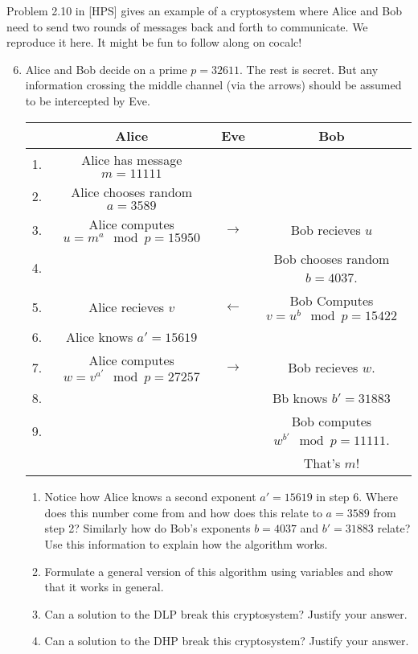 \documentclass[11pt]{article}
\begin{document}
Problem 2.10 in [HPS] gives an example of a cryptosystem where Alice and Bob need to send two rounds of messages back and forth to communicate.  We reproduce it here.  It might be fun to follow along on cocalc!
\begin{enumerate}
  \setcounter{enumi}{5}
  \item{
  Alice and Bob decide on a prime $p = 32611$.  The rest is secret.  But any information crossing the middle channel (via the arrows) should be assumed to be intercepted by Eve.\\
  \begin{tabular}{l|c||c||c}
    &Alice &Eve& Bob\\
    \hline\hline
    1.&Alice has message $m = 11111$&&\\
    \hline
    2.&Alice chooses random $a = 3589$&&\\
    \hline
    3.&Alice computes $u = m^a\mod p = 15950$ & $\longrightarrow$ &Bob recieves $u$\\
    \hline
    4.&&&Bob chooses random $b = 4037$.\\
    \hline
    5.&Alice recieves $v$ & $\longleftarrow$ & Bob Computes $v = u^b\mod p = 15422$\\
    \hline
    6.&Alice knows $a' = 15619$&&\\
    \hline
    7.&Alice computes $w=v^{a'}\mod p = 27257$&$\longrightarrow$&Bob recieves $w$.\\
    \hline
    8.&&&Bb knows $b' = 31883$\\
    \hline
    9.&&&Bob computes $w^{b'}\mod p = 11111$.\\
    &&&That's $m$!
  \end{tabular}
  \begin{enumerate}
    \item{
    Notice how Alice knows a second exponent $a'=15619$ in step 6.  Where does this number come from and how does this relate to $a=3589$ from step 2?  Similarly how do Bob's exponents $b=4037$ and $b'=31883$ relate? Use this information to explain how the algorithm works.
    }
    \item{
    Formulate a general version of this algorithm using variables and show that it works in general.
    }
    \item{
    Can a solution to the DLP break this cryptosystem?  Justify your answer.
    }
    \item{
    Can a solution to the DHP break this cryptosystem?  Justify your answer.
    }
  \end{enumerate}
}
\end{enumerate}
\end{document}
